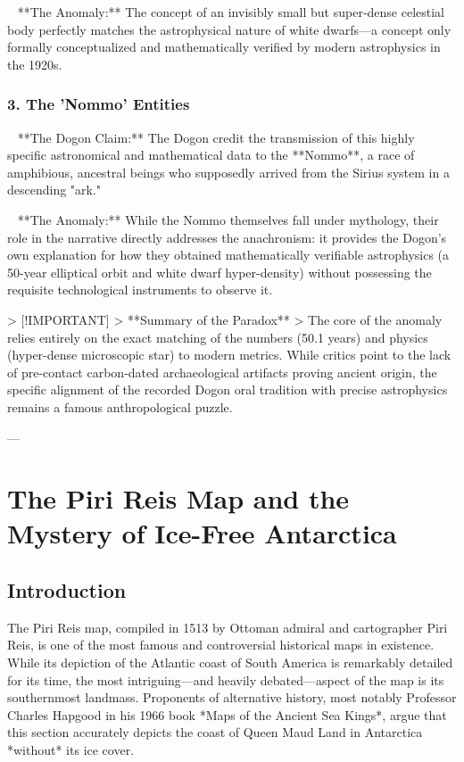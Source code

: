 \documentclass[aps,prd,11pt,onecolumn,superscriptaddress,nofootinbib,floatfix]{revtex4-2}
\begin{document}
\textbullet~  **The Anomaly:** The concept of an invisibly small but super-dense celestial body perfectly matches the astrophysical nature of white dwarfs---a concept only formally conceptualized and mathematically verified by modern astrophysics in the 1920s.



\subsubsection{3. The 'Nommo' Entities}


\textbullet~  **The Dogon Claim:** The Dogon credit the transmission of this highly specific astronomical and mathematical data to the **Nommo**, a race of amphibious, ancestral beings who supposedly arrived from the Sirius system in a descending "ark."

\textbullet~  **The Anomaly:** While the Nommo themselves fall under mythology, their role in the narrative directly addresses the anachronism: it provides the Dogon's own explanation for how they obtained mathematically verifiable astrophysics (a 50-year elliptical orbit and white dwarf hyper-density) without possessing the requisite technological instruments to observe it.



> [!IMPORTANT]
> **Summary of the Paradox**
> The core of the anomaly relies entirely on the exact matching of the numbers (50.1 years) and physics (hyper-dense microscopic star) to modern metrics. While critics point to the lack of pre-contact carbon-dated archaeological artifacts proving ancient origin, the specific alignment of the recorded Dogon oral tradition with precise astrophysics remains a famous anthropological puzzle.




---


\section{The Piri Reis Map and the Mystery of Ice-Free Antarctica}


\subsection{Introduction}
The Piri Reis map, compiled in 1513 by Ottoman admiral and cartographer Piri Reis, is one of the most famous and controversial historical maps in existence. While its depiction of the Atlantic coast of South America is remarkably detailed for its time, the most intriguing---and heavily debated---aspect of the map is its southernmost landmass. Proponents of alternative history, most notably Professor Charles Hapgood in his 1966 book *Maps of the Ancient Sea Kings*, argue that this section accurately depicts the coast of Queen Maud Land in Antarctica *without* its ice cover.
\end{document}
